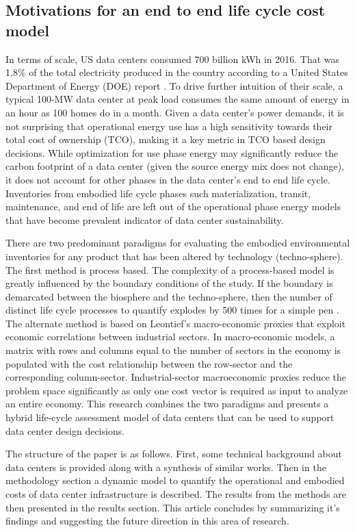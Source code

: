     \subsection{Motivations for an end to end life cycle cost model}
        In terms of scale, US data centers consumed 700 billion kWh in 2016. That was 1.8\% of the total electricity produced in the country according to a United States Department of Energy (DOE) report \cite{Shehabi16}. To drive further intuition of their scale, a typical 100-MW data center at peak load consumes the same amount of energy in an hour as 100 homes do in a month. Given a data center's power demands, it is not surprising that operational energy use has a high sensitivity towards their total cost of ownership (TCO), making it a key metric in TCO based design decisions. While optimization for use phase energy may significantly reduce the carbon footprint of a data center (given the source energy mix does not change), it does not account for other phases in the data center's end to end life cycle. Inventories from embodied life cycle phases such materialization, transit, maintenance, and end of life are left out of the operational phase energy models that have become prevalent indicator of data center sustainability. 

        There are two predominant paradigms for evaluating the embodied environmental inventories for any product that has been altered by technology (techno-sphere). The first method is process based. The complexity of a process-based model is greatly influenced by the boundary conditions of the study. If the boundary is demarcated between the biosphere and the techno-sphere, then the number of distinct life cycle processes to quantify explodes by 500 times for a simple pen \cite{shah11}. The alternate method is based on Leontief's macro-economic proxies that exploit economic correlations between industrial sectors. In macro-economic models, a matrix with rows and columns equal to the number of sectors in the economy is populated with the cost relationship between the row-sector and the corresponding column-sector. Industrial-sector macroeconomic proxies reduce the problem space significantly as only one cost vector is required as input to analyze an entire economy. This research combines the two paradigms and presents a hybrid life-cycle assessment model of data centers that can be used to support data center design decisions. 

        The structure of the paper is as follows. First, some technical background about data centers is provided along with a synthesis of similar works. Then in the methodology section a dynamic model to quantify the operational and embodied costs of data center infrastructure is described. The results from the methods are then presented in the results section. This article concludes by summarizing it's findings and suggesting the future direction in this area of research. 

